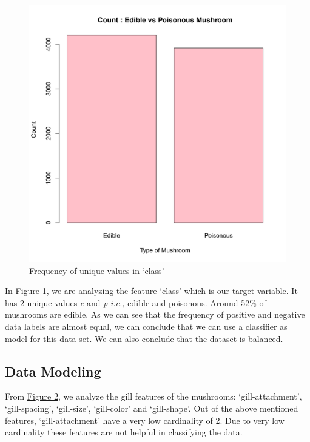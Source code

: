 \documentclass{article}
\begin{document}
\begin{figure}
    \begin{minipage}{\linewidth}
        \raggedleft
        \includegraphics[width=0.9\linewidth]{./images/Rplots_pages-to-jpg-0001.jpg}
        \captionsetup{width=0.7\linewidth}
        \caption{Frequency of unique values in `class'}
        \label{img:1}
    \end{minipage}
\end{figure}


In \hyperref[img:1]{Figure 1}, we are analyzing the feature `class' which is our target variable. It has 2 unique values \textit{e} and \textit{p} \textit{i.e.,} edible  and poisonous. Around 52\% of mushrooms are edible. As we can see that the frequency of positive and negative data labels are almost equal, we can conclude that we can use a classifier as model for this data set. We can also conclude that the dataset is balanced.

\subsection{Data Modeling}\label{subsection:dm}
From \hyperref[img:2]{Figure 2}, we analyze the gill features of the mushrooms: `gill-attachment', `gill-spacing', `gill-size', `gill-color' and `gill-shape'. Out of the above mentioned features, `gill-attachment' have a very low cardinality of 2. Due to very low cardinality these features are not helpful in classifying the data.
\end{document}
